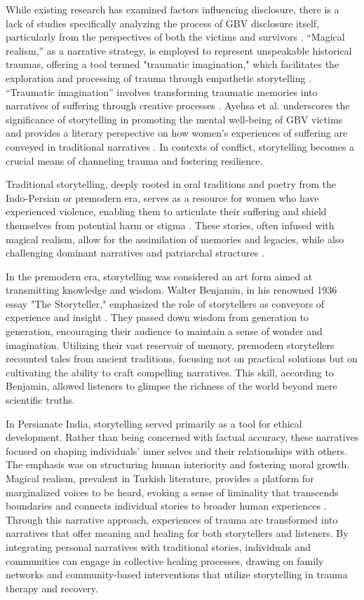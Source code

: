 \documentclass[manuscript,screen]{acmart}
\begin{document}
While existing research has examined factors influencing disclosure, there is a lack of studies specifically analyzing the process of GBV disclosure itself, particularly from the perspectives of both the victims and survivors \cite{42}. “Magical realism,” as a narrative strategy, is employed to represent unspeakable historical traumas, offering a tool termed "traumatic imagination," which facilitates the exploration and processing of trauma through empathetic storytelling \cite{44}. “Traumatic imagination” involves transforming traumatic memories into narratives of suffering through creative processes \cite{30}. Ayehsa et al. underscores the significance of storytelling in promoting the mental well-being of GBV victims and provides a literary perspective on how women's experiences of suffering are conveyed in traditional narratives \cite{30}. In contexts of conflict, storytelling becomes a crucial means of channeling trauma and fostering resilience. 

Traditional storytelling, deeply rooted in oral traditions and poetry from the Indo-Persian or premodern era, serves as a resource for women who have experienced violence, enabling them to articulate their suffering and shield themselves from potential harm or stigma \cite{45}. These stories, often infused with magical realism, allow for the assimilation of memories and legacies, while also challenging dominant narratives and patriarchal structures \cite{46}.

In the premodern era, storytelling was considered an art form aimed at transmitting knowledge and wisdom. Walter Benjamin, in his renowned 1936 essay "The Storyteller," emphasized the role of storytellers as conveyors of experience and insight \cite{47}. They passed down wisdom from generation to generation, encouraging their audience to maintain a sense of wonder and imagination. Utilizing their vast reservoir of memory, premodern storytellers recounted tales from ancient traditions, focusing not on practical solutions but on cultivating the ability to craft compelling narratives. This skill, according to Benjamin, allowed listeners to glimpse the richness of the world beyond mere scientific truths. 

In Persianate India, storytelling served primarily as a tool for ethical development. Rather than being concerned with factual accuracy, these narratives focused on shaping individuals' inner selves and their relationships with others. The emphasis was on structuring human interiority and fostering moral growth. Magical realism, prevalent in Turkish literature, provides a platform for marginalized voices to be heard, evoking a sense of liminality that transcends boundaries and connects individual stories to broader human experiences \cite{46}. Through this narrative approach, experiences of trauma are transformed into narratives that offer meaning and healing for both storytellers and listeners. By integrating personal narratives with traditional stories, individuals and communities can engage in collective healing processes, drawing on family networks and community-based interventions that utilize storytelling in trauma therapy and recovery.
\end{document}
